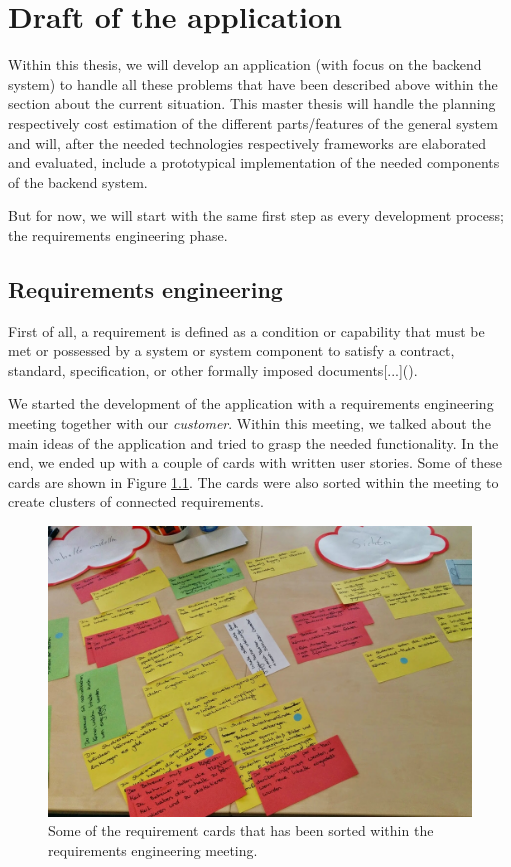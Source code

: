 \chapter[Draft of the application]{Draft of the application}
\label{draft}
Within this thesis, we will develop an application (with focus on the backend system) to handle all these problems that have been described above within the section about the current situation. This master thesis will handle the planning respectively cost estimation of the different parts/features of the general system and will, after the needed technologies respectively frameworks are elaborated and evaluated, include a prototypical implementation of the needed components of the backend system. 

But for now, we will start with the same first step as every development process; the requirements engineering phase.

\section{Requirements engineering}
First of all, a requirement is defined as \glqq[...] a condition or capability that must be met or possessed by a system or system component to satisfy a contract, standard, specification, or other formally imposed documents[...]\grqq  (\cite{IEEEReq}).

We started the development of the application with a requirements engineering meeting together with our \textit{customer}. Within this meeting, we talked about the main ideas of the application and tried to grasp the needed functionality. In the end, we ended up with a couple of cards with written user stories. Some of these cards are shown in Figure \ref{cards}. The cards were also sorted within the meeting to create clusters of connected requirements.

\begin{figure}[th]
\centerline{\includegraphics[width=1\textwidth]{gfx/cards.jpg}}
\caption{Some of the requirement cards that has been sorted within the requirements engineering meeting.}
\label{cards}
\end{figure} 

